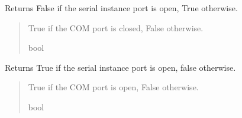 \documentclass[letterpaper,10pt,english]{sphinxmanual}
\begin{document}
\begin{fulllineitems}
\begin{fulllineitems}
\label{\detokenize{Morelia.Devices.SerialPorts:Morelia.Devices.SerialPorts.SerialComm.PortIO.IsSerialClosed}}
\pysigstartsignatures
{}
\pysigstopsignatures
\sphinxAtStartPar
Returns False if the serial instance port is open, True otherwise.
\begin{quote}\begin{description}
\sphinxAtStartPar
True if the COM port is closed, False otherwise.

\sphinxAtStartPar
bool

\end{description}\end{quote}

\end{fulllineitems}


\begin{fulllineitems}
\label{\detokenize{Morelia.Devices.SerialPorts:Morelia.Devices.SerialPorts.SerialComm.PortIO.IsSerialOpen}}
\pysigstartsignatures
{}
\pysigstopsignatures
\sphinxAtStartPar
Returns True if the serial instance port is open, false otherwise.
\begin{quote}\begin{description}
\sphinxAtStartPar
True if the COM port is open, False otherwise.

\sphinxAtStartPar
bool

\end{description}\end{quote}

\end{fulllineitems}



\end{fulllineitems}
\end{document}
